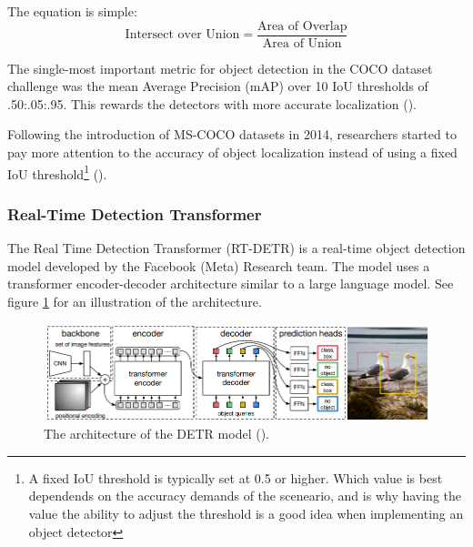 The equation is simple:
\begin{equation}
    \text{Intersect over Union} = \frac{\text{Area of Overlap}}{\text{Area of Union}}
\end{equation}

The single-most important metric for object detection in the COCO dataset challenge was the mean Average Precision (mAP) over 10 IoU thresholds of .50:.05:.95. This rewards the detectors with more accurate localization (\cite{li2014cocodataset}).

Following the introduction of MS-COCO datasets in 2014, researchers started to pay more attention to the accuracy of object localization instead of using a fixed IoU threshold\footnote{A fixed IoU threshold is typically set at 0.5 or higher. Which value is best dependends on the accuracy demands of the sceneario, and is why having the value the ability to adjust the threshold is a good idea when implementing an object detector} (\cite{zou2023object_detection_in_20_years}).



\subsubsection{Real-Time Detection Transformer}
\label{sec:rtdetr}
The Real Time Detection Transformer (RT-DETR) is a real-time object detection model developed by the Facebook (Meta) Research team. The model uses a transformer encoder-decoder architecture similar to a large language model. See figure \ref{fig:detrarchitecture} for an illustration of the architecture.

\begin{figure}[H]
    \centering
    \includegraphics[width=1\linewidth]{Images/Diagrams/DETR2.png}
    \caption{The architecture of the DETR model (\cite{carion2020endtoend}).}
    \label{fig:detrarchitecture}
\end{figure}

